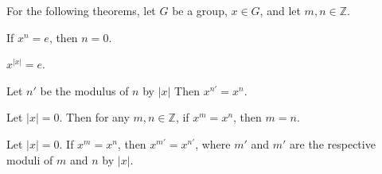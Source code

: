 For the following theorems, let $G$ be a group, $x \in G$, and let $m,n \in \mathbb{Z}$.

\begin{theorem}
    \label{theorem : gpow_order}
    \leanok
    If $x^n = e$, then $n = 0$.
\end{theorem}

\begin{theorem}
    \label{theorem : gpow_order_zero}
    \leanok
    $x^{|x|} = e$.
\end{theorem}

\begin{theorem}
    \label{theorem : gpow_mod_order}
    Let $n'$ be the modulus of $n$ by $|x|$ Then $x^{n'} = x^n$.
\end{theorem}

\begin{theorem}
    \label{theorem : gpow_inj_of_order_zero}
    Let $|x| = 0$. Then for any $m,n \in \mathbb{Z}$, if $x^m = x^n$, then $m = n$.
\end{theorem}

\begin{theorem}
    \label{theorem : mod_order_eq_of_gpow_eq}
    Let $|x| = 0$. If $x^m = x^n$, then $x^{m'} = x^{n'}$, where $m'$ and $m'$ are the respective moduli of $m$ and $n$ by $|x|$.
\end{theorem}
